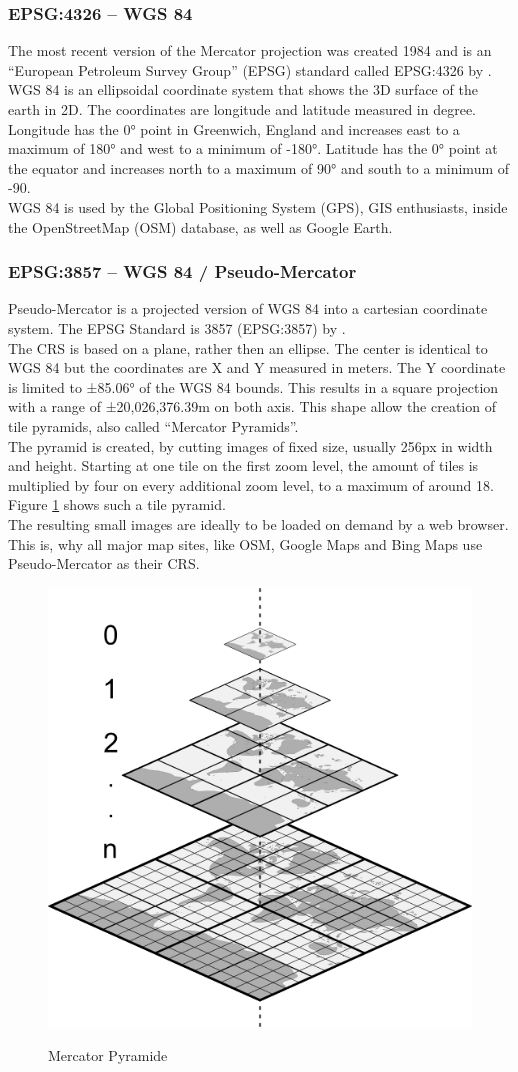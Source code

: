 \subsubsection{EPSG:4326 -- WGS 84}
The most recent version of the Mercator projection was created 1984 and is an \enquote{European Petroleum Survey Group} (EPSG) standard called EPSG:4326 by \cite{Decker1986}.\\
WGS 84 is an ellipsoidal coordinate system that shows the 3D surface of the earth in 2D. The coordinates are longitude and latitude measured in degree. Longitude has the 0° point in Greenwich, England and increases east to a maximum of 180° and west to a minimum of -180°. Latitude has the 0° point at the equator and increases north to a maximum of 90° and south to a minimum of -90.\\
WGS 84 is used by the Global Positioning System (GPS), GIS enthusiasts, inside the OpenStreetMap (OSM) database, as well as Google Earth.

\subsubsection{EPSG:3857 -- WGS 84 / Pseudo-Mercator}
Pseudo-Mercator is a projected version of WGS 84 into a cartesian coordinate system. The EPSG Standard is 3857 (EPSG:3857) by \cite{Grafarend1995}.\\
The CRS is based on a plane, rather then an ellipse. The center is identical to WGS 84 but the coordinates are X and Y measured in meters. The Y coordinate is limited to ±85.06° of the WGS 84 bounds. This results in a square projection with a range of ±20,026,376.39m on both axis. This shape allow the creation of tile pyramids, also called \enquote{Mercator Pyramids}. \\
The pyramid is created, by cutting images of fixed size, usually 256px in width and height. Starting at one tile on the first zoom level, the amount of tiles is multiplied by four on every additional zoom level, to a maximum of around 18. Figure \ref{img:mercator-pyramid} shows such a tile pyramid.\\
The resulting small images are ideally to be loaded on demand by a web browser. This is, why all major map sites, like OSM, Google Maps and Bing Maps use Pseudo-Mercator as their CRS.
\begin{figure}[H]
	\centering
	\includegraphics[width=0.4\columnwidth]{res/mercator-pyramid.png}\\
	\caption[]{Mercator Pyramide}
	\label{img:mercator-pyramid}
\end{figure}


